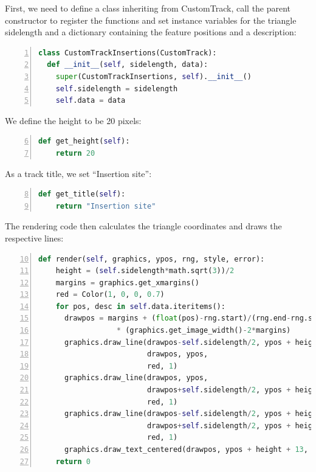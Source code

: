 \documentclass[a4paper]{scrreprt}
\begin{document}
First, we need to define a class inheriting from CustomTrack, call the parent constructor to register the functions and set instance variables for the triangle sidelength and a dictionary containing the feature positions and a description:

\begin{lstlisting}[language=Python, showstringspaces=false,numbers=left,frame=single]
class CustomTrackInsertions(CustomTrack):
  def __init__(self, sidelength, data):
    super(CustomTrackInsertions, self).__init__()
    self.sidelength = sidelength
    self.data = data
\end{lstlisting}

We define the height to be 20 pixels:

\begin{lstlisting}[language=Python, firstnumber=6, showstringspaces=false,numbers=left,frame=single]
  def get_height(self):
    return 20
\end{lstlisting}

As a track title, we set ``Insertion site'':

\begin{lstlisting}[language=Python, firstnumber=8,  showstringspaces=false,numbers=left,frame=single]
  def get_title(self):
    return "Insertion site"
\end{lstlisting}

The rendering code then calculates the triangle coordinates and draws the respective lines:

\begin{lstlisting}[language=Python, firstnumber=10, showstringspaces=false,numbers=left,frame=single]
  def render(self, graphics, ypos, rng, style, error):
    height = (self.sidelength*math.sqrt(3))/2
    margins = graphics.get_xmargins()
    red = Color(1, 0, 0, 0.7)
    for pos, desc in self.data.iteritems():
      drawpos = margins + (float(pos)-rng.start)/(rng.end-rng.start+1)         \
                  * (graphics.get_image_width()-2*margins)
      graphics.draw_line(drawpos-self.sidelength/2, ypos + height,             \
                         drawpos, ypos,                                        \
                         red, 1)
      graphics.draw_line(drawpos, ypos,                                        \
                         drawpos+self.sidelength/2, ypos + height,             \
                         red, 1)
      graphics.draw_line(drawpos-self.sidelength/2, ypos + height,             \
                         drawpos+self.sidelength/2, ypos + height,             \
                         red, 1)
      graphics.draw_text_centered(drawpos, ypos + height + 13, str(desc))
    return 0
\end{lstlisting}
\end{document}
